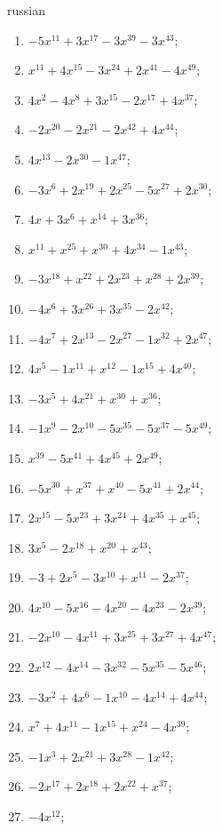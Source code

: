 \documentclass[a4paper]{article}
\begin{document}
\begin{otherlanguage*}{russian}
\begin{enumerate}
\item $-5x^11 + 3x^17-3x^39-3x^43$;
\item $x^11 + 4x^15-3x^24 + 2x^41-4x^49$;
\item $4x^2-4x^8 + 3x^15-2x^17 + 4x^37$;
\item $-2x^20-2x^21-2x^42 + 4x^44$;
\item $4x^13-2x^30-1x^47$;
\item $-3x^6 + 2x^19 + 2x^25-5x^27 + 2x^30$;
\item $4x + 3x^6 + x^14 + 3x^36$;
\item $x^11 + x^25 + x^30 + 4x^34-1x^43$;
\item $-3x^18 + x^22 + 2x^23 + x^28 + 2x^39$;
\item $-4x^6 + 3x^26 + 3x^35-2x^42$;
\item $-4x^7 + 2x^13-2x^27-1x^32 + 2x^47$;
\item $4x^5-1x^11 + x^12-1x^15 + 4x^40$;
\item $-3x^5 + 4x^21 + x^30 + x^36$;
\item $-1x^9-2x^10-5x^35-5x^37-5x^49$;
\item $x^39-5x^41 + 4x^45 + 2x^49$;
\item $-5x^30 + x^37 + x^40-5x^41 + 2x^44$;
\item $2x^15-5x^23 + 3x^24 + 4x^35 + x^45$;
\item $3x^5-2x^18 + x^20 + x^43$;
\item $-3 + 2x^5-3x^10 + x^11-2x^37$;
\item $4x^10-5x^16-4x^20-4x^23-2x^39$;
\item $-2x^10-4x^11 + 3x^25 + 3x^27 + 4x^47$;
\item $2x^12-4x^14-3x^32-5x^35-5x^46$;
\item $-3x^2 + 4x^6-1x^10-4x^14 + 4x^44$;
\item $x^7 + 4x^11-1x^15 + x^24-4x^39$;
\item $-1x^3 + 2x^21 + 3x^28-1x^42$;
\item $-2x^17 + 2x^18 + 2x^22 + x^37$;
\item $-4x^12$;
\end{enumerate}
\end{otherlanguage*}
\end{document}
